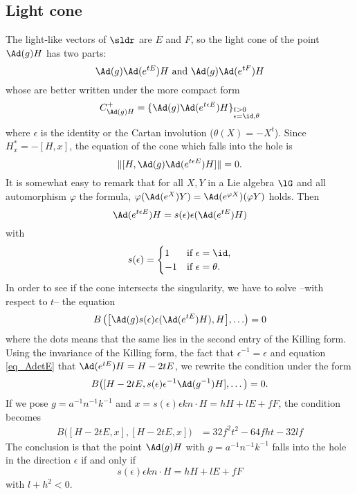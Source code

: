 \subsection{Light cone}

The light-like vectors of $\sldr$ are $E$ and $F$, so the light cone of the point $\Ad(g)H$ has two parts:
\[
\Ad(g)\Ad(e^{tE})H\text{ and } \Ad(g)\Ad(e^{tF})H
\]
whose are better written under the more compact form
\begin{equation}
C^+_{\Ad(g)H}=\{\Ad(g)\Ad(e^{t\epsilon E})H\}_{%
\begin{subarray}{l}
t>0\\
\epsilon=\id,\theta
\end{subarray}
}
\end{equation}
where $\epsilon$ is the identity or the Cartan involution ($\theta(X)=-X^t$). Since $H^*_x=-[H,x]$, the equation of the cone which falls into the hole is
\begin{equation}
\|[H,\Ad(g)\Ad(e^{t\epsilon E})H]\|=0.
\end{equation}
It is somewhat easy to remark that for all $X,Y$ in a Lie algebra $\lG$ and all automorphism $\varphi$ the formula, $\varphi(\Ad(e^X)Y)=\Ad(e^{\varphi X})(\varphi Y)$ holds.
Then
\begin{equation}
\Ad(e^{t\epsilon E})H=s(\epsilon)\epsilon(\Ad(e^{tE})H)
\end{equation}
with
\[
  s(\epsilon)=
\begin{cases}
1&\text{if }\epsilon=\id,\\
-1&\text{if }\epsilon=\theta.
\end{cases}
\]
In order to see if the cone intersects the singularity, we have to solve --with respect to $t$-- the equation
\begin{equation}
B
\left(%
\big[  \Ad(g)s(\epsilon)\epsilon(\Ad(e^{tE})H),H\big],\ldots
\right)=0
\end{equation}
where the dots means that the same lies in the second entry of the Killing form. Using the invariance of the Killing form, the fact that $\epsilon^{-1}=\epsilon$ and
    equation \eqref{eq_AdetE} that $\Ad(e^{tE})H=H-2tE$, we rewrite the condition under the form
\begin{equation}
	B\big(	[H-2tE,s(\epsilon)\epsilon^{-1}\Ad(g^{-1})H],\ldots\big)=0.
\end{equation}
If we pose $g=a^{-1} n^{-1} k^{-1}$ and $x=s(\epsilon)\epsilon kn\cdot H=hH+lE+fF$, the condition becomes
\begin{equation}
\begin{split}
	B\big( [H-2tE,x],[H-2tE,x] \big)&=32f^2t^2-64fht-32lf
\end{split}
\end{equation}
The conclusion is that the point $\Ad(g)H$ with $g=a^{-1} n^{-1} k^{-1}$ falls into the hole in the direction $\epsilon$ if and only if
\[
 s(\epsilon)\epsilon kn\cdot H=hH+lE+fF
\]
with $l+h^2<0$.


